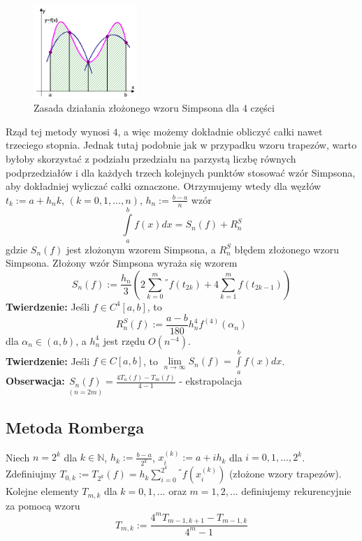 \documentclass[a4paper,11pt]{article}
\begin{document}
\begin{figure}[H]
\centering
\includegraphics[width=0.35\textwidth]{wzorsimpsona.png}
\caption{Zasada działania złożonego wzoru Simpsona dla $4$ części}
\label{wzorsimpsona}
\end{figure}

\noindent Rząd tej metody wynosi $4$, a więc możemy dokładnie obliczyć całki nawet trzeciego stopnia. Jednak tutaj podobnie jak w przypadku wzoru trapezów, warto byłoby skorzystać z podziału przedziału na parzystą liczbę równych podprzedziałów i dla każdych trzech kolejnych punktów stosować wzór Simpsona, aby dokładniej wyliczać całki oznaczone. Otrzymujemy wtedy dla węzłów $t_k := a+h_nk$, $(k=0,1,\ldots, n)$, $h_n:=\frac{b-a}{n}$ wzór
$$ \int\limits_{a}^{b} f(x)dx = S_n(f) + R_n^S $$
\noindent gdzie $S_n(f)$ jest złożonym wzorem Simpsona, a $ R_n^S$ błędem złożonego wzoru Simpsona. Złożony wzór Simpsona wyraża się wzorem
$$ S_n(f) := \frac{h_n}{3} \left( 2\sum\limits_{k=0}^{m}{}^{''} f(t_{2k}) + 4\sum\limits_{k=1}^{m} f(t_{2k-1}) \right)$$
\noindent \textbf{Twierdzenie:} Jeśli $f\in C^4[a,b]$, to
$$ R_n^S(f) := \frac{a-b}{180} h_n^4 f^{(4)}(\alpha_n)$$
\noindent dla $\alpha_n \in (a,b)$, a $h_n^4$ jest rzędu $O(n^{-4})$.\\
\noindent \textbf{Twierdzenie:} Jeśli $f\in C[a,b]$, to $\lim\limits_{n\to\infty} S_n(f) = \int\limits_{a}^{b} f(x)dx$. \\
\noindent \textbf{Obserwacja:} $\underset{(n=2m)}{S_n(f)} = \frac{4T_n(f) - T_m(f)}{4-1}$ - ekstrapolacja

\subsection{Metoda Romberga}
Niech $n=2^k$ dla $k \in \mathbb{N}$, $h_k := \frac{b-a}{2^k}$, $x_i^{(k)} := a+ih_k$ dla $i=0,1,\ldots, 2^k$. Zdefiniujmy $T_{0,k} := T_{2^k}(f) = h_k\sum\limits_{i=0}^{2^k}{}^{''}f(x_i^{(k)})$ (złożone wzory trapezów). Kolejne elementy $T_{m,k}$ dla $k = 0,1,\ldots$ oraz $m=1,2,\ldots$ definiujemy rekurencyjnie za pomocą wzoru
$$ T_{m, k} := \frac{4^mT_{m-1, k+1} - T_{m-1, k}}{4^m-1} $$
\end{document}
